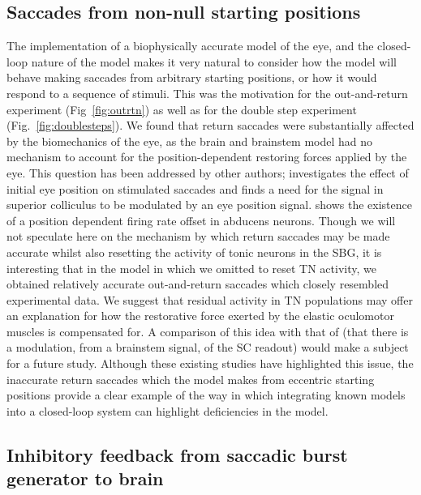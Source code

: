 \documentclass{frontiersSCNS}
\begin{document}
\subsection{Saccades from non-null starting positions}

The implementation of a biophysically accurate model of the eye, and
the closed-loop nature of the model makes it very natural to consider
how the model will behave making saccades from arbitrary starting
positions, or how it would respond to a sequence of stimuli. This was
the motivation for the out-and-return experiment (Fig~\ref{fig:outrtn})
as well as for the double step experiment (Fig.~\ref{fig:doublesteps}).
We found that return saccades were substantially affected by the
biomechanics of the eye, as the brain and brainstem model had no
mechanism to account for the position-dependent restoring forces applied
by the eye. This question has been addressed by other authors;
\cite{groh_effects_2011} investigates the effect of
initial eye position on stimulated saccades
and finds a need for the signal in superior colliculus to be modulated
by an eye position signal. \cite{ling_effects_2007} shows the existence
of a position dependent firing rate offset in abducens neurons. Though
we will not speculate here on the mechanism by which return saccades
may be made accurate whilst also resetting the activity of tonic
neurons in the SBG, it is interesting that in the model in which we
omitted to reset TN activity, we obtained relatively accurate
out-and-return saccades which closely resembled experimental data.
We suggest that residual activity in TN populations may offer an
explanation for how the restorative force exerted by
the elastic oculomotor muscles is compensated for. A comparison of
this idea with that of \cite{groh_effects_2011} (that there is a
modulation, from a brainstem signal, of the SC readout) would make
a subject for a future study. Although these existing studies have
highlighted this issue, the inaccurate return saccades which the
model makes from eccentric starting positions provide a clear example
of the way in which integrating known models into a closed-loop system
can highlight deficiencies in the model.

\subsection{Inhibitory feedback from saccadic burst generator to brain}
\end{document}
